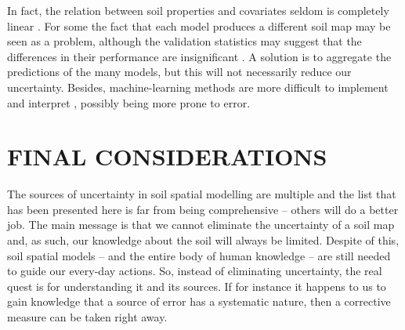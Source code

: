 In fact, the relation between soil properties and covariates seldom is completely linear 
\cite{McKenzieEtAl1999}. For some the fact that each model produces a
different soil map may be seen as a problem, although the validation statistics may suggest that the 
differences in their performance are insignificant \cite{HeungEtAl2016}. A solution is to aggregate 
the predictions of the many models, but this will not necessarily reduce our uncertainty. Besides, 
machine-learning methods are more difficult to implement and interpret \cite{Grunwald2009}, possibly 
being more prone to error.

\section{FINAL CONSIDERATIONS}

The sources of uncertainty in soil spatial modelling are multiple and the list that has been presented here
is far from being comprehensive -- others will do a better job. The main message is that we cannot 
eliminate the uncertainty of a soil map and, as such, our knowledge about the soil will always
be limited. Despite of this, soil spatial models -- and the entire body of human knowledge -- are still
needed to guide our every-day actions. So, instead of eliminating uncertainty, the real quest is for
understanding it and its sources. If for instance it happens to us to gain knowledge that a source of 
error has a systematic nature, then a corrective measure can be taken right away.


